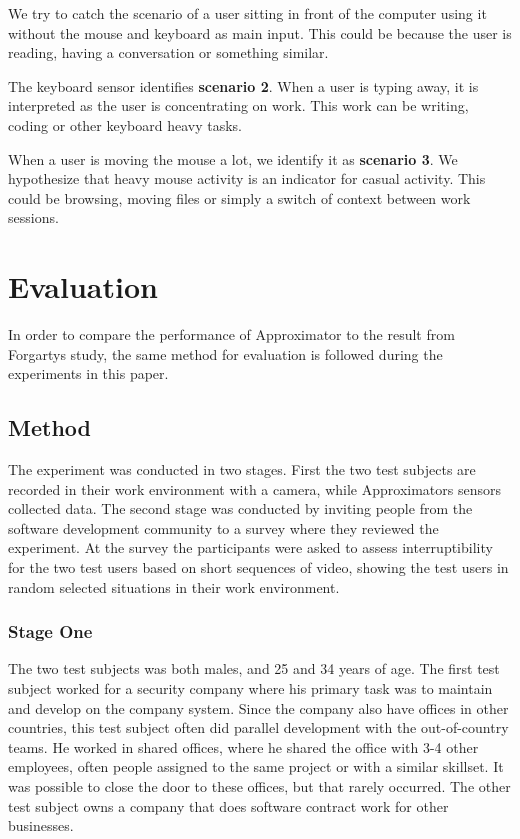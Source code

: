 \documentclass{sigchi}
\begin{document}
We try to catch the scenario of a user sitting in front of the computer using it without the mouse and keyboard as main input.
This could be because the user is reading, having a conversation or something similar.

The keyboard sensor identifies \textbf{scenario 2}.
When a user is typing away, it is interpreted as the user is concentrating on work.
This work can be writing, coding or other keyboard heavy tasks.

When a user is moving the mouse a lot, we identify it as \textbf{scenario 3}.
We hypothesize that heavy mouse activity is an indicator for casual activity.
This could be browsing, moving files or simply a switch of context between work sessions.


\section{Evaluation}
In order to compare the performance of Approximator to the result from Forgartys study, the same method for evaluation is followed during the experiments in this paper.

\subsection{Method}
The experiment was conducted in two stages.
First the two test subjects are recorded in their work environment with a camera, while Approximators sensors collected data.
The second stage was conducted by inviting people from the software development community to a survey where they reviewed the experiment.
At the survey the participants were asked to assess interruptibility for the two test users based on short sequences of video, showing the test users in random selected situations in their work environment.

\subsubsection{Stage One}
The two test subjects was both males, and 25 and 34 years of age.
The first test subject worked for a security company where his primary task was to maintain and develop on the company system.
Since the company also have offices in other countries, this test subject often did parallel development with the out-of-country teams.
He worked in shared offices, where he shared the office with 3-4 other employees, often people assigned to the same project or with a similar skillset.
It was possible to close the door to these offices, but that rarely occurred.
The other test subject owns a company that does software contract work for other businesses.
\end{document}
